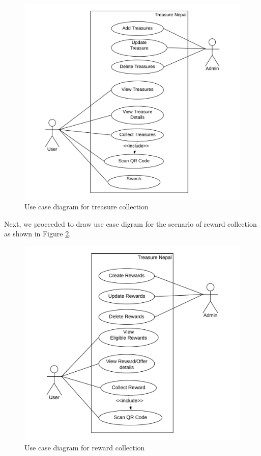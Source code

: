 \documentclass[12pt, a4paper, oneside]{article}
\begin{document}
\begin{figure}[H]
\includegraphics[width=\linewidth]{use-case-diagrams/treasure.png}
\centering
\caption{Use case diagram for treasure collection}
\label{fig:use-case-treasure}
\end{figure}

Next, we proceeded to draw use case digram for the scenario of reward collection as shown in Figure \ref{fig:use-case-reward}.

\begin{figure}[H]
\includegraphics[width=\linewidth]{use-case-diagrams/reward.png}
\centering
\caption{Use case diagram for reward collection}
\label{fig:use-case-reward}
\end{figure}
\end{document}
